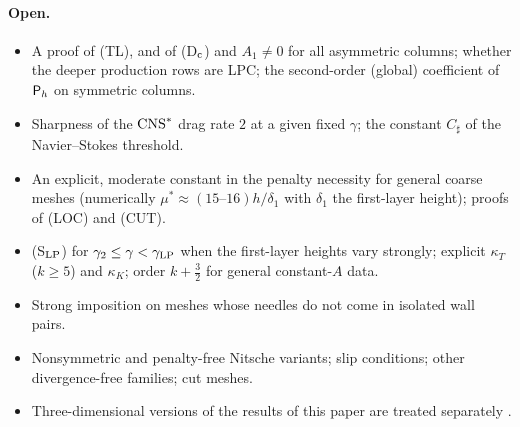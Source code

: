 \paragraph{Open.}
\begin{itemize}
\item A proof of (TL), and of (D$_{\rm c}$) and $A_1\ne0$ for all asymmetric columns; whether the deeper production rows are LPC; the second-order (global) coefficient of $\mathsf P_h$ on symmetric columns.
\item Sharpness of the $\mathrm{CNS}^\ast$ drag rate $2$ at a given fixed $\gamma$; the constant $C_\sharp$ of the Navier--Stokes threshold.
\item An explicit, moderate constant in the penalty necessity for general coarse meshes (numerically $\mu^\ast\approx(15\text{--}16)h/\delta_1$ with $\delta_1$ the first-layer height); proofs of (LOC) and (CUT).
\item (S$_{\rm LP}$) for $\gamma_2\le\gamma<\gamma_{\rm LP}$ when the first-layer heights vary strongly; explicit $\kappa_T$ ($k\ge5$) and $\kappa_K$; order $k+\frac32$ for general constant-$A$ data.
\item Strong imposition on meshes whose needles do not come in isolated wall pairs.
\item Nonsymmetric and penalty-free Nitsche variants; slip conditions; other divergence-free families; cut meshes.
\item Three-dimensional versions of the results of this paper are treated separately \cite{PadhiThreeD}.
\end{itemize}
